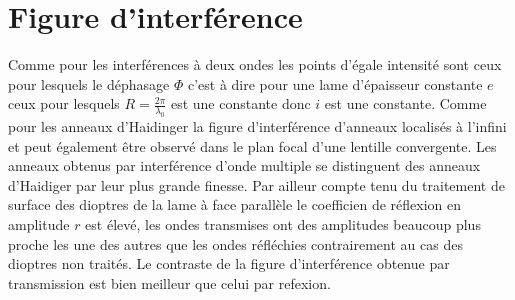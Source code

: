 \documentclass[a4paper,12pt]{article}
\theoremstyle{StyleTheo_will}
\theoremstyle{remark}
\begin{document}
\section{Figure d'interférence}
Comme pour les interférences à deux ondes les points d'égale intensité sont ceux pour lesquels le déphasage $\varPhi$ c'est à dire pour une lame d'épaisseur constante $e$ ceux pour lesquels $R = \frac{2\pi}{\lambda_0}$ est une constante donc $i$ est une constante. Comme pour les anneaux d'Haidinger la figure d'interférence d'anneaux localisés à l'infini et peut également être observé dans le plan focal d'une lentille convergente. Les anneaux obtenus par interférence d'onde multiple se distinguent des anneaux d'Haidiger par leur plus grande finesse. Par ailleur compte tenu du traitement de surface des dioptres de la lame à face parallèle le coefficien de réflexion en amplitude $r$ est élevé, les ondes transmises ont des amplitudes beaucoup plus proche les une des autres que les ondes réfléchies contrairement au cas des dioptres non traités. Le contraste de la figure d'interférence obtenue par transmission est bien meilleur que celui par refexion.
\end{document}

